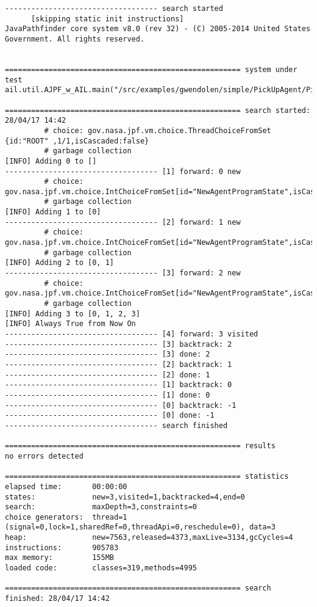 \noindent \begin{lstlisting}
----------------------------------- search started
      [skipping static init instructions]
JavaPathfinder core system v8.0 (rev 32) - (C) 2005-2014 United States Government. All rights reserved.


====================================================== system under test
ail.util.AJPF_w_AIL.main("/src/examples/gwendolen/simple/PickUpAgent/PickUpAgent.ail","/src/examples/gwendolen/simple/PickUpAgent/PickUpAgent.psl","0")

====================================================== search started: 28/04/17 14:42
		 # choice: gov.nasa.jpf.vm.choice.ThreadChoiceFromSet {id:"ROOT" ,1/1,isCascaded:false}
		 # garbage collection
[INFO] Adding 0 to []
----------------------------------- [1] forward: 0 new
		 # choice: gov.nasa.jpf.vm.choice.IntChoiceFromSet[id="NewAgentProgramState",isCascaded:false,>0]
		 # garbage collection
[INFO] Adding 1 to [0]
----------------------------------- [2] forward: 1 new
		 # choice: gov.nasa.jpf.vm.choice.IntChoiceFromSet[id="NewAgentProgramState",isCascaded:false,>0]
		 # garbage collection
[INFO] Adding 2 to [0, 1]
----------------------------------- [3] forward: 2 new
		 # choice: gov.nasa.jpf.vm.choice.IntChoiceFromSet[id="NewAgentProgramState",isCascaded:false,>0]
		 # garbage collection
[INFO] Adding 3 to [0, 1, 2, 3]
[INFO] Always True from Now On
----------------------------------- [4] forward: 3 visited
----------------------------------- [3] backtrack: 2
----------------------------------- [3] done: 2
----------------------------------- [2] backtrack: 1
----------------------------------- [2] done: 1
----------------------------------- [1] backtrack: 0
----------------------------------- [1] done: 0
----------------------------------- [0] backtrack: -1
----------------------------------- [0] done: -1
----------------------------------- search finished

====================================================== results
no errors detected

====================================================== statistics
elapsed time:       00:00:00
states:             new=3,visited=1,backtracked=4,end=0
search:             maxDepth=3,constraints=0
choice generators:  thread=1 (signal=0,lock=1,sharedRef=0,threadApi=0,reschedule=0), data=3
heap:               new=7563,released=4373,maxLive=3134,gcCycles=4
instructions:       905783
max memory:         155MB
loaded code:        classes=319,methods=4995

====================================================== search finished: 28/04/17 14:42
\end{lstlisting}

